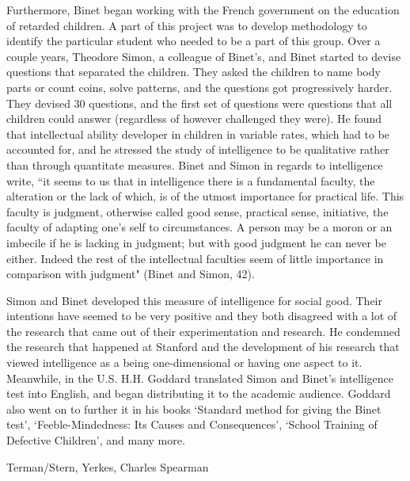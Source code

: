 \documentclass[11pt, oneside]{article}
\begin{document}
\par Furthermore, Binet began working with the French government on the education of retarded children. A part of this project was to develop methodology to identify the particular student who needed to be a part of this group. Over a couple years, Theodore Simon, a colleague of Binet's, and Binet started to devise questions that separated the children. They asked the children to name body parts or count coins, solve patterns, and the questions got progressively harder. They devised 30 questions, and the first set of questions were questions that all children could answer (regardless of however challenged they were). He found that intellectual ability developer in children in variable rates, which had to be accounted for, and he stressed the study of intelligence to be qualitative rather than through quantitate measures. Binet and Simon in regards to intelligence write, ``it seems to us that in intelligence there is a fundamental faculty, the alteration or the lack of which, is of the utmost importance for practical life. This faculty is judgment, otherwise called good sense, practical sense, initiative, the faculty of adapting one's self to circumstances. A person may be a moron or an imbecile if he is lacking in judgment; but with good judgment he can never be either. Indeed the rest of the intellectual faculties seem of little importance in comparison with judgment" (Binet and Simon, 42). 

\par Simon and Binet developed this measure of intelligence for social good. Their intentions have seemed to be very positive and they both disagreed with a lot of the research that came out of their experimentation and research. He condemned the research that happened at Stanford and the development of his research that viewed intelligence as a being one-dimensional or having one aspect to it. Meanwhile, in the U.S. H.H. Goddard translated Simon and Binet's intelligence test into English, and began distributing it to the academic audience. Goddard also went on to further it in his books `Standard method for giving the Binet test', `Feeble-Mindedness: Its Causes and Consequences', `School Training of Defective Children', and many more.


\par Terman/Stern, Yerkes, Charles Spearman

\end{document}
